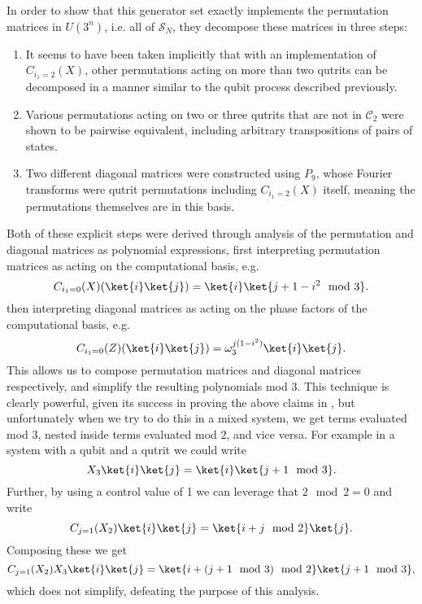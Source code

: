 In order to show that this generator set exactly implements the permutation matrices in $U\left(3^n\right)$, i.e. all of $\mathcal{S}_{N}$, they decompose these matrices in three steps:
\begin{enumerate}
	\item It seems to have been taken implicitly that with an implementation of $C_{i_1 = 2}(X)$, other permutations acting on more than two qutrits can be decomposed in a manner similar to the qubit process described previously.
	\item Various permutations acting on two or three qutrits that are not in $\mathcal{C}_2$ were shown to be pairwise equivalent, including arbitrary transpositions of pairs of states.
	\item Two different diagonal matrices were constructed using $P_9$, whose Fourier transforms were qutrit permutations including $C_{i_1=2}(X)$ itself, meaning the permutations themselves are in this basis.
\end{enumerate}

Both of these explicit steps were derived through analysis of the permutation and diagonal matrices as polynomial expressions, first interpreting permutation matrices as acting on the computational basis, e.g.
\[C_{i_1=0}(X)(\ket{i}\ket{j}) = \ket{i}\ket{j+1-i^2 \mod 3}.\]
then interpreting diagonal matrices as acting on the phase factors of the computational basis, e.g.
\[C_{i_1=0}(Z)(\ket{i}\ket{j}) = \omega_{3}^{j(1-i^2)}\ket{i}\ket{j}.\]
This allows us to compose permutation matrices and diagonal matrices respectively, and simplify the resulting polynomials mod 3. This technique is clearly powerful, given its success in proving the above claims in \cite{arithmetics}, but unfortunately when we try to do this in a mixed system, we get terms evaluated mod 3, nested inside terms evaluated mod 2, and vice versa. For example in a system with a qubit and a qutrit we could write
\[X_3\ket{i}\ket{j} = \ket{i}\ket{j+1\mod 3}.\]
Further, by using a control value of 1 we can leverage that $2 \mod 2 = 0$ and write
\[C_{j=1}(X_2)\ket{i}\ket{j} = \ket{i+j \mod 2}\ket{j}.\]
Composing these we get
\[C_{j=1}(X_2)X_3\ket{i}\ket{j} = \ket{i+(j+1 \mod 3)\mod 2}\ket{j + 1 \mod 3},\]
which does not simplify, defeating the purpose of this analysis. 

